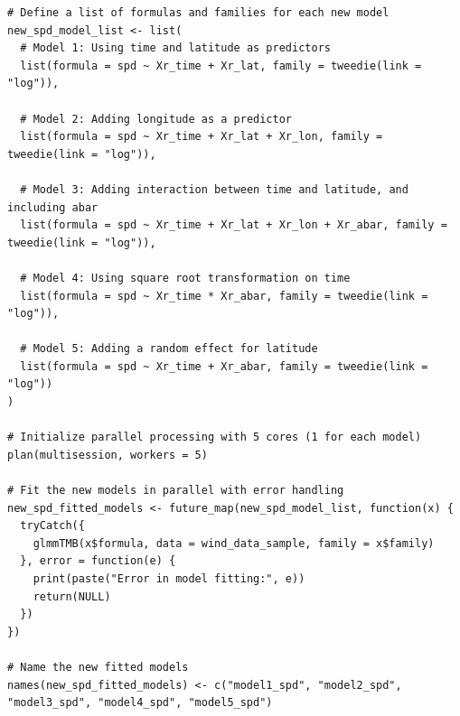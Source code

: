 \begin{verbatim}
# Define a list of formulas and families for each new model
new_spd_model_list <- list(
  # Model 1: Using time and latitude as predictors
  list(formula = spd ~ Xr_time + Xr_lat, family = tweedie(link = "log")),
  
  # Model 2: Adding longitude as a predictor
  list(formula = spd ~ Xr_time + Xr_lat + Xr_lon, family = tweedie(link = "log")),
  
  # Model 3: Adding interaction between time and latitude, and including abar
  list(formula = spd ~ Xr_time + Xr_lat + Xr_lon + Xr_abar, family = tweedie(link = "log")),
  
  # Model 4: Using square root transformation on time
  list(formula = spd ~ Xr_time * Xr_abar, family = tweedie(link = "log")),
  
  # Model 5: Adding a random effect for latitude
  list(formula = spd ~ Xr_time + Xr_abar, family = tweedie(link = "log"))
)

# Initialize parallel processing with 5 cores (1 for each model)
plan(multisession, workers = 5)

# Fit the new models in parallel with error handling
new_spd_fitted_models <- future_map(new_spd_model_list, function(x) {
  tryCatch({
    glmmTMB(x$formula, data = wind_data_sample, family = x$family)
  }, error = function(e) {
    print(paste("Error in model fitting:", e))
    return(NULL)
  })
})

# Name the new fitted models
names(new_spd_fitted_models) <- c("model1_spd", "model2_spd", "model3_spd", "model4_spd", "model5_spd")



\end{verbatim}


